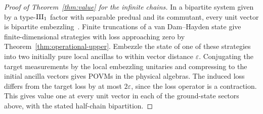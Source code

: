 \begin{proof}[Proof of Theorem~\ref{thm:value} for the infinite chains]
In a bipartite system given by a type-$\mathrm{III}_1$ factor with separable predual and its
commutant, every unit vector is bipartite embezzling~\cite[Theorems~11 and~63]{vLSWW24}.
Finite truncations of a van Dam--Hayden state give finite-dimensional strategies with
loss approaching zero by Theorem~\ref{thm:operational-upper}. Embezzle the state of
one of these strategies into two initially pure local ancillas to within vector
distance $\varepsilon$. Conjugating the target measurements by the local embezzling
unitaries and compressing to the initial ancilla vectors gives POVMs in the physical
algebras. The induced loss differs from the target loss by at most $2\varepsilon$,
since the loss operator is a contraction. This gives value one at every unit vector
in each of the ground-state sectors above, with the stated half-chain bipartition.
\end{proof}

